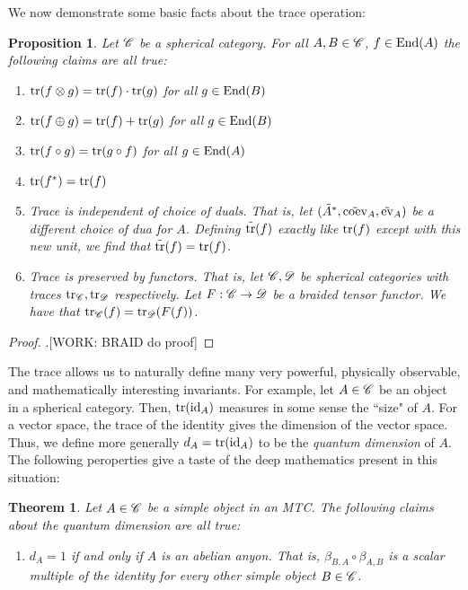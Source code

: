 \documentclass{article}
\newtheorem{theorem}{Theorem}[section]
\newtheorem{proposition}{Proposition}[section]
\theoremstyle{definition}
\numberwithin{figure}{section}
\begin{document}
\begin{enumerate}[\thesection .1.]
We now demonstrate some basic facts about the trace operation:

\begin{proposition}\label{trace} Let $\mathscr{C}$ be a spherical category. For all $A,B\in \mathscr{C}$, $f\in \mathrm{End}(A)$ the following claims are all true:

\begin{enumerate}
\item $\mathrm{tr}(f\otimes g)=\mathrm{tr}(f)\cdot \mathrm{tr}(g)$ for all $g\in \mathrm{End}(B)$
\item $\mathrm{tr}(f\oplus g)=\mathrm{tr}(f)+\mathrm{tr}(g)$ for all $g\in \mathrm{End}(B)$
\item $\mathrm{tr}(f\circ g)=\mathrm{tr}(g\circ f)$ for all $g\in \mathrm{End}(A)$
\item $\mathrm{tr}(f^{*})=\mathrm{tr}(f)$
\item Trace is independent of choice of duals. That is, let $(\tilde{A}^*,\tilde{\mathrm{coev}}_{A}, \tilde{\mathrm{ev}}_A)$ be a different choice of dua  for $A$. Defining $\tilde{\mathrm{tr}}(f)$ exactly like $\mathrm{tr}(f)$ except with this new unit, we find that $\tilde{\mathrm{tr}}(f)=\mathrm{tr}(f)$.
\item Trace is preserved by functors. That is, let $\mathscr{C},\mathscr{D}$ be spherical categories with traces $\mathrm{tr}_{\mathscr{C}},\mathrm{tr}_{\mathscr{D}}$ respectively. Let $F:\mathscr{C}\to \mathscr{D}$ be a braided tensor functor. We have that $\mathrm{tr}_{\mathscr{C}}(f)=\mathrm{tr}_{\mathscr{D}}(F(f))$.
\end{enumerate}

\end{proposition}
\begin{proof} .[WORK: BRAID do proof]
\end{proof}

The trace allows us to naturally define many very powerful, physically observable, and mathematically interesting invariants. For example, let $A\in \mathscr{C}$ be an object in a spherical category. Then, $\mathrm{tr}(\mathrm{id}_A)$ measures in some sense the ``size" of $A$. For a vector space, the trace of the identity gives the dimension of the vector space. Thus, we define more generally $d_A=\mathrm{tr}(\mathrm{id}_A)$ to be the \textit{quantum dimension} of $A$. The following peroperties give a taste of the deep mathematics present in this situation:

\begin{theorem} Let $A\in \mathscr{C}$ be a simple object in an MTC. The following claims about the quantum dimension are all true:

\begin{enumerate}

\item $d_A=1$ if and only if $A$ is an abelian anyon. That is, $\beta_{B,A}\circ \beta_{A,B}$ is a scalar multiple of the identity for every other simple object $B\in \mathscr{C}$.


\end{enumerate}
\end{theorem}
\end{enumerate}
\end{document}
